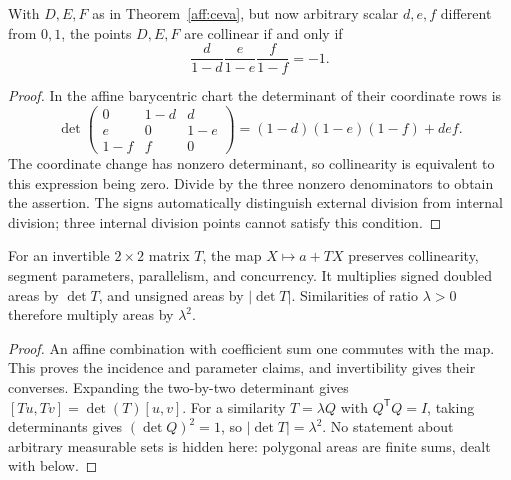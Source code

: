 \begin{theorem}\label{aff:menelaus}
With $D,E,F$ as in Theorem~\ref{aff:ceva}, but now arbitrary scalar
$d,e,f$ different from $0,1$, the points $D,E,F$ are collinear if and
only if
\[
 \frac d{1-d}\frac e{1-e}\frac f{1-f}=-1.
\]
\end{theorem}
\begin{proof}
In the affine barycentric chart the determinant of their coordinate rows is
\[
 \det\begin{pmatrix}0&1-d&d\\ e&0&1-e\\1-f&f&0\end{pmatrix}
  =(1-d)(1-e)(1-f)+def.
\]
The coordinate change has nonzero determinant, so collinearity is
equivalent to this expression being zero. Divide by the three nonzero
denominators to obtain the assertion. The signs automatically distinguish
external division from internal division; three internal division points
cannot satisfy this condition.
\end{proof}

\begin{theorem}\label{aff:maps}
For an invertible $2\times2$ matrix $T$, the map $X\mapsto a+TX$
preserves collinearity, segment parameters, parallelism, and concurrency.
It multiplies signed doubled areas by $\det T$, and unsigned areas by
$|\det T|$. Similarities of ratio $\lambda>0$ therefore multiply
areas by $\lambda^2$.
\end{theorem}
\begin{proof}
An affine combination with coefficient sum one commutes with the map.
This proves the incidence and parameter claims, and invertibility gives
their converses. Expanding the two-by-two determinant gives
$[Tu,Tv]=\det(T)[u,v]$. For a similarity $T=\lambda Q$ with
$Q^\mathsf TQ=I$, taking determinants gives $(\det Q)^2=1$,
so $|\det T|=\lambda^2$. No statement about arbitrary measurable sets
is hidden here: polygonal areas are finite sums, dealt with below.
\end{proof}

